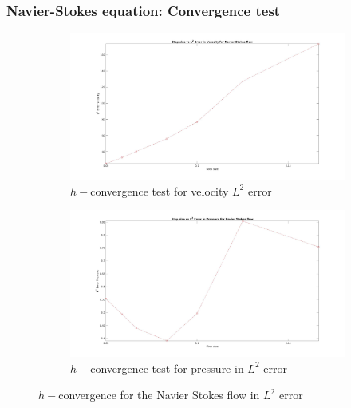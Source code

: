 \documentclass{beamer}
\begin{document}
\begin{frame}
\frametitle{Navier-Stokes equation: Convergence test}
\begin{figure}
\begin{subfigure}{0.4\textwidth}	
    \includegraphics[width=\linewidth]{L2_convergence_velocity_n_s.jpg}
    \caption{$h-$convergence test for velocity $L^2$ error}
    \label{fig:vel_navier_stoke_conv}
\end{subfigure}
\begin{subfigure}{0.4\textwidth}	
    \includegraphics[width=\linewidth]{L2_convergence_pressure_n_s.jpg}
  \caption{$h-$convergence test for pressure in $L^2$ error}
  \label{fig:pre_navier_stoke_conv}
\end{subfigure}
\caption{$h-$convergence for the Navier Stokes flow in $L^2$ error}
\label{navier_stoke_conv_l2}
\end{figure}
\end{frame}
\end{document}
